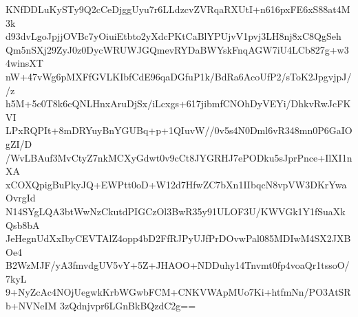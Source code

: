 KNfDDLuKySTy9Q2cCeDjggUyu7r6LLdzcvZVRqaRXUtI+n616pxFE6xS88at4M3k
d93dvLgoJpjjOVBc7yOiuiEtbto2yXdcPKtCaBlYPUjvV1pvj3LH8nj8xC8QgSeh
Qm5nSXj29ZyJ0z0DycWRUWJGQmevRYDaBWYskFnqAGW7iU4LCb827g+w34winsXT
nW+47vWg6pMXFfGVLKIbfCdE96qaDGfuP1k/BdRa6AcoUfP2/sToK2JpgvjpJ//z
h5M+5c0T8k6cQNLHnxAruDjSx/iLcxgs+617jibmfCNOhDyVEYi/DhkvRwJcFKVI
LPxRQPIt+8mDRYuyBnYGUBq+p+1QIuvW//0v5s4N0Dml6vR348mn0P6GaIOgZI/D
/WvLBAuf3MvCtyZ7nkMCXyGdwt0v9cCt8JYGRHJ7ePODku5sJprPnce+IlXI1nXA
xCOXQpigBuPkyJQ+EWPtt0oD+W12d7HfwZC7bXn1IIbqcN8vpVW3DKrYwaOvrgId
N14SYgLQA3btWwNzCkutdPIGCzOl3BwR35y91ULOF3U/KWVGk1Y1fSuaXkQsb8bA
JeHegnUdXxIbyCEVTAlZ4opp4bD2FfRJPyUJfPrDOvwPal085MDIwM4SX2JXBOe4
B2WzMJF/yA3fmvdgUV5vY+5Z+JHAOO+NDDuhy14Tnvmt0fp4voaQr1tssoO/7kyL
9+NyZcAc4NOjUegwkKrbWGwbFCM+CNKVWApMUo7Ki+htfmNn/PO3AtSRb+NVNeIM
3zQdnjvpr6LGnBkBQzdC2g==
